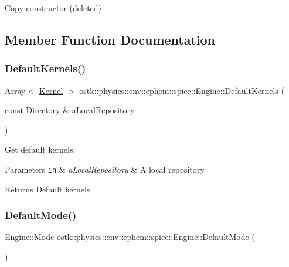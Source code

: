 Copy constructor (deleted) 



\subsection{Member Function Documentation}
\mbox{\label{classostk_1_1physics_1_1env_1_1ephem_1_1spice_1_1_engine_a719948b0aaa86f50f832db8488c5b1f2}} 
\subsubsection{\texorpdfstring{Default\+Kernels()}{DefaultKernels()}}
{\footnotesize\ttfamily Array$<$ \hyperlink{classostk_1_1physics_1_1env_1_1ephem_1_1spice_1_1_kernel}{Kernel} $>$ ostk\+::physics\+::env\+::ephem\+::spice\+::\+Engine\+::\+Default\+Kernels (\begin{DoxyParamCaption}\item[{const Directory \&}]{a\+Local\+Repository }\end{DoxyParamCaption})\hspace{0.3cm}{\ttfamily [static]}}



Get default kernels. 


\begin{DoxyParams}[1]{Parameters}
\mbox{\tt in}  & {\em a\+Local\+Repository} & A local repository \\
\hline
\end{DoxyParams}
\begin{DoxyReturn}{Returns}
Default kernels 
\end{DoxyReturn}
\mbox{\label{classostk_1_1physics_1_1env_1_1ephem_1_1spice_1_1_engine_a6b8bdf7ead864216cd07fc9d81fab39b}} 
\subsubsection{\texorpdfstring{Default\+Mode()}{DefaultMode()}}
{\footnotesize\ttfamily \hyperlink{classostk_1_1physics_1_1env_1_1ephem_1_1spice_1_1_engine_a803b82d8f41c81e861852098b6b75ae2}{Engine\+::\+Mode} ostk\+::physics\+::env\+::ephem\+::spice\+::\+Engine\+::\+Default\+Mode (\begin{DoxyParamCaption}{ }\end{DoxyParamCaption})\hspace{0.3cm}{\ttfamily [static]}}



